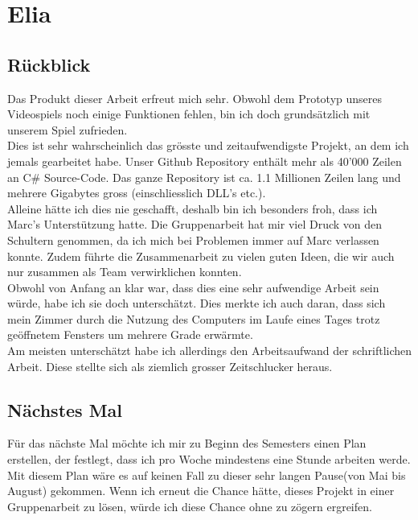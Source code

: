 \chapter{Elia}

\section{Rückblick}
Das Produkt dieser Arbeit erfreut mich sehr. Obwohl dem Prototyp unseres Videospiels noch einige Funktionen fehlen, bin ich doch grundsätzlich mit unserem Spiel zufrieden. \\
Dies ist sehr wahrscheinlich das grösste und zeitaufwendigste Projekt, an dem ich jemals gearbeitet habe. Unser Github Repository enthält mehr als 40'000 Zeilen an C\# Source-Code.
Das ganze Repository ist ca. 1.1 Millionen Zeilen lang und mehrere Gigabytes gross (einschliesslich DLL's etc.). \\
Alleine hätte ich dies nie geschafft, deshalb bin ich besonders froh, dass ich Marc's Unterstützung hatte. Die Gruppenarbeit hat mir viel Druck von den Schultern genommen, da ich mich bei Problemen immer auf Marc
verlassen konnte. Zudem führte die Zusammenarbeit zu vielen guten Ideen, die wir auch nur zusammen als Team verwirklichen konnten. 
\\
Obwohl von Anfang an klar war, dass dies eine sehr aufwendige Arbeit sein würde, habe ich sie doch unterschätzt. Dies merkte ich auch daran, dass sich mein Zimmer durch die Nutzung des Computers im Laufe eines Tages
trotz geöffnetem Fensters um mehrere Grade erwärmte.\\
Am meisten unterschätzt habe ich allerdings den Arbeitsaufwand der schriftlichen Arbeit. Diese stellte sich als ziemlich grosser Zeitschlucker heraus. 

\section{Nächstes Mal}
Für das nächste Mal möchte ich mir zu Beginn des Semesters einen Plan erstellen, der festlegt, dass ich pro Woche mindestens eine Stunde arbeiten werde. Mit diesem Plan wäre es auf keinen Fall zu dieser sehr langen
Pause(von Mai bis August) gekommen. Wenn ich erneut die Chance hätte, dieses Projekt in einer Gruppenarbeit zu lösen, würde ich diese Chance ohne zu zögern ergreifen. 